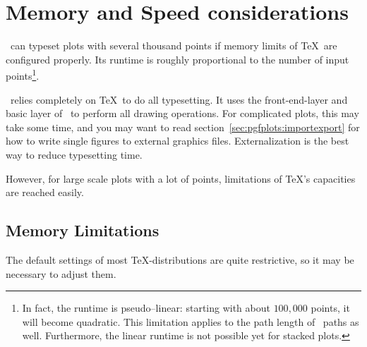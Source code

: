 \section{Memory and Speed considerations}
\label{sec:pgfplots:optimization}
\PGFPlots\ can typeset plots with several thousand points if memory limits of \TeX\ are configured properly. Its runtime is roughly proportional to the number of input points\footnote{In fact, the runtime is pseudo--linear: starting with about $100{,}000$ points, it will become quadratic. This limitation applies to the path length of \PGF\ paths as well. Furthermore, the linear runtime is not possible yet for stacked plots.}.

\pgfplotsexpensiveexample
\begin{codeexample}[]
\end{codeexample}

\pgfplotsexpensiveexample
\begin{codeexample}[]
\end{codeexample}

\PGFPlots\ relies completely on \TeX\ to do all typesetting. It uses the front-end-layer and basic layer of \PGF\ to perform all drawing operations. For complicated plots, this may take some time, and you may want to read section~\ref{sec:pgfplots:importexport} for how to write single figures to external graphics files. Externalization is the best way to reduce typesetting time.

However, for large scale plots with a lot of points, limitations of \TeX's capacities are reached easily.

\subsection{Memory Limitations}
The default settings of most \TeX-distributions are quite restrictive, so it may be necessary to adjust them. 

